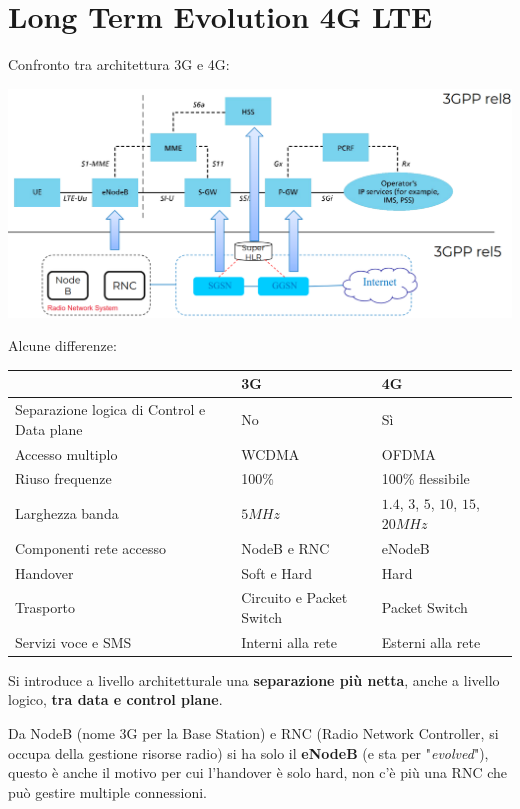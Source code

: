 \section{Long Term Evolution 4G LTE}

Confronto tra architettura 3G e 4G:
\begin{center}
	\includegraphics[width=0.98\linewidth]{img/4g/3g4g}
\end{center}

Alcune differenze: 
\begin{center}
	\begin{tabular}{| m{3.5cm} | m{2cm} | m{2cm} |}
		\hline
		& 3G & 4G \\
		\hline
		Separazione logica di Control e Data plane &  No & Sì \\
		\hline
		Accesso multiplo  &WCDMA & OFDMA \\
		\hline
		Riuso frequenze & 100\% & 100\% flessibile \\
		\hline
		Larghezza banda & $5 MHz$ & $1.4$, $3$, $5$, $10$, $15$, $20 MHz$ \\
		\hline		
		Componenti rete accesso & NodeB e RNC & eNodeB \\
		\hline
		Handover & Soft e Hard & Hard \\
		\hline
		Trasporto & Circuito e Packet Switch & Packet Switch \\
		\hline
		Servizi voce e SMS & Interni alla rete & Esterni alla rete \\
		\hline
	\end{tabular}
\end{center}

Si introduce a livello architetturale una \textbf{separazione più netta}, anche a livello logico, \textbf{tra data e control plane}. 

Da NodeB (nome 3G per la Base Station) e RNC (Radio Network Controller, si occupa della gestione risorse radio) si ha solo il \textbf{eNodeB} (e sta per "\textit{evolved}"), questo è anche il motivo per cui l'handover è solo hard, non c'è più una RNC che può gestire multiple connessioni. 

